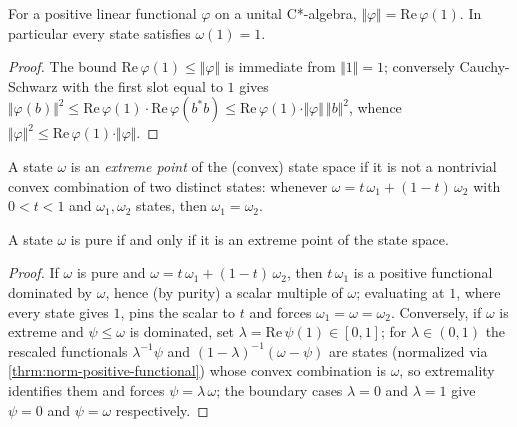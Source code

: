 \begin{theorem}
    \label{thrm:norm-positive-functional}
    \leanok
    For a positive linear functional $\varphi$ on a unital C*-algebra, $\Vert\varphi\Vert = \mathrm{Re}\,\varphi(1)$. In particular every state satisfies $\omega(1) = 1$.
\end{theorem}
\begin{proof}
    \leanok
    The bound $\mathrm{Re}\,\varphi(1) \le \Vert\varphi\Vert$ is immediate from $\Vert 1\Vert = 1$; conversely Cauchy-Schwarz with the first slot equal to $1$ gives $\Vert\varphi(b)\Vert^2 \le \mathrm{Re}\,\varphi(1)\cdot\mathrm{Re}\,\varphi(b^* b) \le \mathrm{Re}\,\varphi(1)\cdot\Vert\varphi\Vert\,\Vert b\Vert^2$, whence $\Vert\varphi\Vert^2 \le \mathrm{Re}\,\varphi(1)\cdot\Vert\varphi\Vert$.
\end{proof}

\begin{definition}
    \label{def:extreme-state}
    \leanok
    A state $\omega$ is an \emph{extreme point} of the (convex) state space if it is not a nontrivial convex combination of two distinct states: whenever $\omega = t\,\omega_1 + (1-t)\,\omega_2$ with $0 < t < 1$ and $\omega_1, \omega_2$ states, then $\omega_1 = \omega_2$.
\end{definition}

\begin{theorem}
    \label{thrm:pure-iff-extreme}
    \leanok
    A state $\omega$ is pure if and only if it is an extreme point of the state space.
\end{theorem}
\begin{proof}
    \leanok
    If $\omega$ is pure and $\omega = t\,\omega_1 + (1-t)\,\omega_2$, then $t\,\omega_1$ is a positive functional dominated by $\omega$, hence (by purity) a scalar multiple of $\omega$; evaluating at $1$, where every state gives $1$, pins the scalar to $t$ and forces $\omega_1 = \omega = \omega_2$. Conversely, if $\omega$ is extreme and $\psi \le \omega$ is dominated, set $\lambda = \mathrm{Re}\,\psi(1) \in [0,1]$; for $\lambda \in (0,1)$ the rescaled functionals $\lambda^{-1}\psi$ and $(1-\lambda)^{-1}(\omega - \psi)$ are states (normalized via \ref{thrm:norm-positive-functional}) whose convex combination is $\omega$, so extremality identifies them and forces $\psi = \lambda\,\omega$; the boundary cases $\lambda = 0$ and $\lambda = 1$ give $\psi = 0$ and $\psi = \omega$ respectively.
\end{proof}

